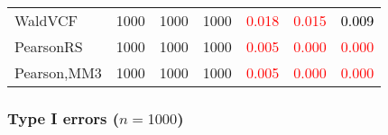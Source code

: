\documentclass[
]{article}
\begin{document}
\begin{table}[H]
{\begin{tabular}[t]{lrrrrrr}
\hspace{1em}WaldVCF & 1000 & 1000 & 1000 & \textcolor{red}{0.018} & \textcolor{red}{0.015} & \textcolor{black}{0.009}\\
\hspace{1em}PearsonRS & 1000 & 1000 & 1000 & \textcolor{red}{0.005} & \textcolor{red}{0.000} & \textcolor{red}{0.000}\\
\hspace{1em}Pearson,MM3 & 1000 & 1000 & 1000 & \textcolor{red}{0.005} & \textcolor{red}{0.000} & \textcolor{red}{0.000}\\
\bottomrule
\end{tabular}}
\endgroup{}
\end{table}

\hypertarget{type-i-errors-n1000-3}{%
\subsubsection{\texorpdfstring{Type I errors
(\(n=1000\))}{Type I errors (n=1000)}}\label{type-i-errors-n1000-3}}
\end{document}
